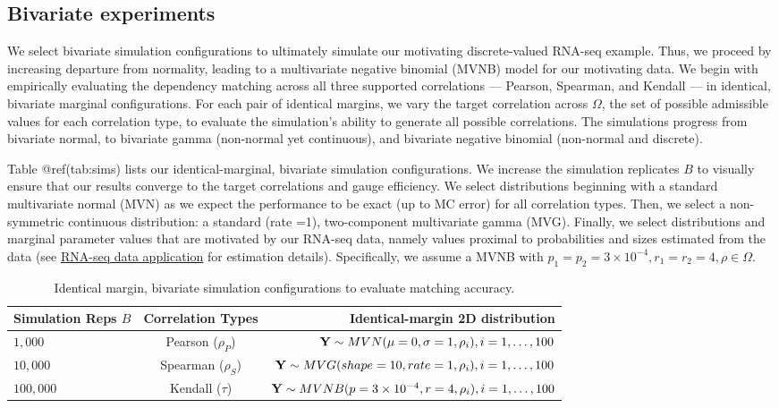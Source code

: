\documentclass{article}
\begin{document}
\hypertarget{bivariate-experiments}{%
\subsection{Bivariate experiments}\label{bivariate-experiments}}

We select bivariate simulation configurations to ultimately simulate our
motivating discrete-valued RNA-seq example. Thus, we proceed by
increasing departure from normality, leading to a multivariate negative
binomial (MVNB) model for our motivating data. We begin with empirically
evaluating the dependency matching across all three supported
correlations --- Pearson, Spearman, and Kendall --- in identical,
bivariate marginal configurations. For each pair of identical margins,
we vary the target correlation across \(\Omega\), the set of possible
admissible values for each correlation type, to evaluate the
simulation's ability to generate all possible correlations. The
simulations progress from bivariate normal, to bivariate gamma
(non-normal yet continuous), and bivariate negative binomial (non-normal
and discrete).

Table @ref(tab:sims) lists our identical-marginal, bivariate simulation
configurations. We increase the simulation replicates \(B\) to visually
ensure that our results converge to the target correlations and gauge
efficiency. We select distributions beginning with a standard
multivariate normal (MVN) as we expect the performance to be exact (up
to MC error) for all correlation types. Then, we select a non-symmetric
continuous distribution: a standard (rate =1), two-component
multivariate gamma (MVG). Finally, we select distributions and marginal
parameter values that are motivated by our RNA-seq data, namely values
proximal to probabilities and sizes estimated from the data (see
\href{examples}{RNA-seq data application} for estimation details).
Specifically, we assume a MVNB with
\(p_1 = p_2 = 3\times10^{-4}, r_1 = r_2 = 4, \rho \in \Omega\).

\begin{table}[]
\centering
\caption{ \label{tab:sims} Identical margin, bivariate simulation configurations to evaluate matching accuracy.}
\begin{tabular}{@{}lcr@{}}
\toprule
Simulation Reps $B$ & Correlation Types & Identical-margin 2D distribution \\ \midrule
$1,000$ & Pearson ($\rho_P$) & ${\bf Y} \sim MVN( \mu= 0 , \sigma = 1, \rho_i ), i=1,\ldots,100$ \\
$10,000$ & Spearman ($\rho_S$) & ${\bf Y} \sim MVG( shape = 10, rate = 1, \rho_i ), i=1,\ldots,100$ \\
$100,000$ & Kendall ($\tau$) & ${\bf Y} \sim MVNB(p = 3\times10^{-4}, r = 4,\rho_i), i=1,\ldots,100$ \\ \bottomrule
\end{tabular}
\end{table}
\end{document}
